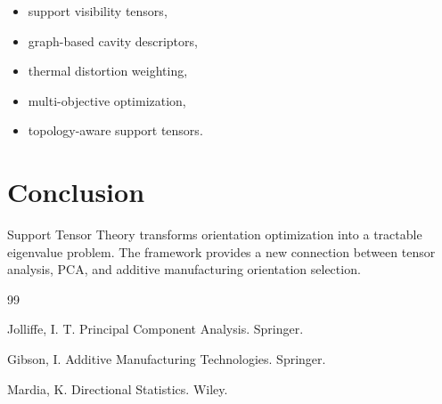 \documentclass[journal,11pt]{article}
\begin{document}
\begin{itemize}
\item support visibility tensors,
\item graph-based cavity descriptors,
\item thermal distortion weighting,
\item multi-objective optimization,
\item topology-aware support tensors.
\end{itemize}

\section{Conclusion}

Support Tensor Theory transforms orientation optimization into a tractable eigenvalue problem.
The framework provides a new connection between tensor analysis, PCA, and additive manufacturing orientation selection.



\begin{thebibliography}{99}

Jolliffe, I. T.
Principal Component Analysis.
Springer.

Gibson, I.
Additive Manufacturing Technologies.
Springer.

Mardia, K.
Directional Statistics.
Wiley.

\end{thebibliography}
\end{document}
